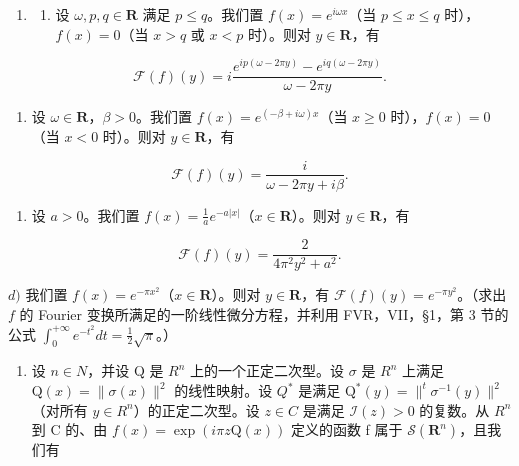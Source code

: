 
\begin{enumerate}
\def\labelenumi{\arabic{enumi})}
\tightlist
\item
  \begin{enumerate}
  \def\labelenumii{\alph{enumii})}
  \tightlist
  \item
    设 \(\omega, p, q \in \mathbf{R}\) 满足 \(p \leqslant q\)。我们置 \(f(x) = e^{i\omega x}\)（当 \(p \leqslant x \leqslant q\) 时），\(f(x) = 0\)（当 \(x > q\) 或 \(x < p\) 时）。则对 \(y \in \mathbf{R}\)，有
  \end{enumerate}
\end{enumerate}

\[
\mathcal {F} (f) (y) = i \frac {e ^ {i p (\omega - 2 \pi y)} - e ^ {i q (\omega - 2 \pi y)}}{\omega - 2 \pi y}.
\]

\begin{enumerate}
\def\labelenumi{\alph{enumi})}
\setcounter{enumi}{1}
\tightlist
\item
    设 \(\omega \in \mathbf{R}\)，\(\beta > 0\)。我们置 \(f(x) = e^{(-\beta + i\omega)x}\)（当 \(x \geqslant 0\) 时），\(f(x) = 0\)（当 \(x < 0\) 时）。则对 \(y \in \mathbf{R}\)，有
\end{enumerate}

\[
\mathcal {F} (f) (y) = \frac {i}{\omega - 2 \pi y + i \beta}.
\]

\begin{enumerate}
\def\labelenumi{\alph{enumi})}
\setcounter{enumi}{2}
\tightlist
\item
    设 \(a > 0\)。我们置 \(f(x) = \frac{1}{a} e^{-a|x|}\)（\(x \in \mathbf{R}\)）。则对 \(y \in \mathbf{R}\)，有
\end{enumerate}

\[
\mathcal {F} (f) (y) = \frac {2}{4 \pi^ {2} y ^ {2} + a ^ {2}}.
\]

\(d)\) 我们置 \(f(x) = e^{-\pi x^2}\)（\(x \in \mathbf{R}\)）。则对 \(y \in \mathbf{R}\)，有 \(\mathcal{F}(f)(y) = e^{-\pi y^2}\)。（求出 \(f\) 的 Fourier 变换所满足的一阶线性微分方程，并利用 FVR，VII，§1，第 3 节的公式 \(\int_0^{+\infty} e^{-t^2} dt = \frac{1}{2} \sqrt{\pi}\)。）

\begin{enumerate}
\def\labelenumi{\alph{enumi})}
\setcounter{enumi}{4}
\tightlist
\item
    设 \(n \in N\)，并设 Q 是 \(R^{n}\) 上的一个正定二次型。设 \(\sigma\) 是 \(R^{n}\) 上满足 \(\mathrm{Q}(x) = \| \sigma(x) \|^{2}\) 的线性映射。设 \(Q^{*}\) 是满足 \(\mathrm{Q}^{*}(y) = \|^{t} \sigma^{-1}(y) \|^{2}\)（对所有 \(y \in R^{n}\)）的正定二次型。设 \(z \in C\) 是满足 \(\mathcal{I}(z) > 0\) 的复数。从 \(R^{n}\) 到 C 的、由 \(f(x) = \exp(i\pi z\mathrm{Q}(x))\) 定义的函数 f 属于 \(\mathcal{S}(\mathbf{R}^{n})\)，且我们有
\end{enumerate}

